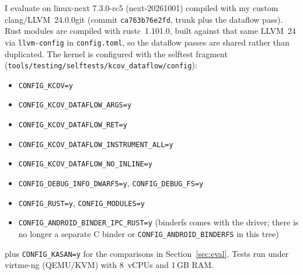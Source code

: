\documentclass{article}
\begin{document}
I evaluate \toolname{} on linux-next 7.3.0-rc5 (next-20261001) compiled with
my custom clang/LLVM~24.0.0git (commit \texttt{ca763b76e2fd}, trunk plus the
dataflow pass). Rust modules are compiled with rustc~1.101.0, built against
that same LLVM~24 via \texttt{llvm-config} in \texttt{config.toml}, so the
dataflow passes are shared rather than duplicated. The
kernel is configured with the selftest fragment
(\texttt{tools/testing/selftests/kcov\_dataflow/config}):
\begin{itemize}[nosep]
  \item \texttt{CONFIG\_KCOV=y}
  \item \texttt{CONFIG\_KCOV\_DATAFLOW\_ARGS=y}
  \item \texttt{CONFIG\_KCOV\_DATAFLOW\_RET=y}
  \item \texttt{CONFIG\_KCOV\_DATAFLOW\_INSTRUMENT\_ALL=y}
  \item \texttt{CONFIG\_KCOV\_DATAFLOW\_NO\_INLINE=y}
  \item \texttt{CONFIG\_DEBUG\_INFO\_DWARF5=y}, \texttt{CONFIG\_DEBUG\_FS=y}
  \item \texttt{CONFIG\_RUST=y}, \texttt{CONFIG\_MODULES=y}
  \item \texttt{CONFIG\_ANDROID\_BINDER\_IPC\_RUST=y} (binderfs comes with the
        driver; there is no longer a separate C binder or
        \texttt{CONFIG\_ANDROID\_BINDERFS} in this tree)
\end{itemize}
plus \texttt{CONFIG\_KASAN=y} for the comparisons in
Section~\ref{sec:eval}. Tests run under virtme-ng (QEMU/KVM) with 8~vCPUs
and 1\,GB RAM.
\end{document}
